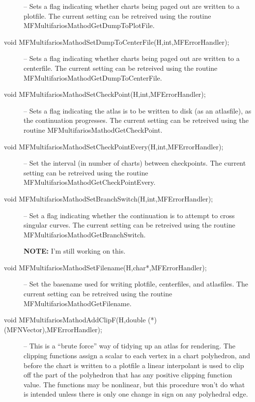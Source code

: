 \documentclass[12pt]{article}
\begin{document}
\begin{description}
-- Sets a flag indicating whether charts being paged out are written to a plotfile.
The current setting can be retreived using the routine {MFMultifariosMathodGetDumpToPlotFile}.
\item [void MFMultifariosMathodSetDumpToCenterFile(H,int,MFErrorHandler);]
-- Sets a flag indicating whether charts being paged out are written to a centerfile.
The current setting can be retreived using the routine {MFMultifariosMathodGetDumpToCenterFile}.
\item [void MFMultifariosMathodSetCheckPoint(H,int,MFErrorHandler);]
-- Sets a flag indicating the atlas is to be written to disk (as an atlasfile), as the continuation
progresses.
The current setting can be retreived using the routine {MFMultifariosMathodGetCheckPoint}.
\item [void MFMultifariosMathodSetCheckPointEvery(H,int,MFErrorHandler);]
-- Set the interval (in number of charts) between checkpoints.
The current setting can be retreived using the routine {MFMultifariosMathodGetCheckPointEvery}.
\item [void MFMultifariosMathodSetBranchSwitch(H,int,MFErrorHandler);]
-- Set a flag indicating whether the continuation is to attempt to cross singular curves.
The current setting can be retreived using the routine {MFMultifariosMathodGetBranchSwitch}.

{\bf NOTE: } I'm still working on this.
\item [void MFMultifariosMathodSetFilename(H,char*,MFErrorHandler);]
-- Set the basename used for writing plotfile, centerfiles, and atlasfiles.
The current setting can be retreived using the routine {MFMultifariosMathodGetFilename}.
\item [void MFMultifariosMathodAddClipF(H,double (*)(MFNVector),MFErrorHandler);]
-- This is a ``brute force'' way of tidying up an atlas for rendering. The clipping functions
assign a scalar to each vertex in a chart polyhedron, and before the chart is written to a 
plotfile a linear interpolant is used to clip off the part of the polyhedron that has any positive
clipping function value. The functions may be nonlinear, but this procedure won't do what is intended
unless there is only one change in sign on any polyhedral edge. 


\end{description}
\end{document}
